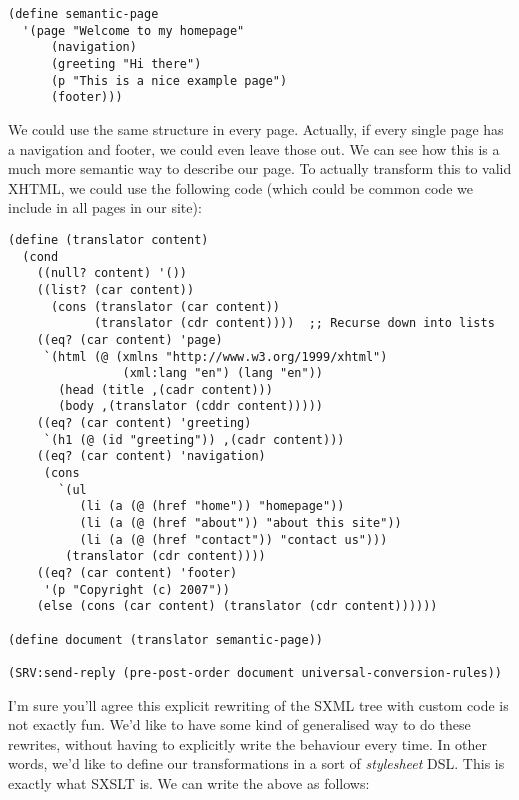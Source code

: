 \documentclass{article}
\begin{document}
\begin{verbatim}
(define semantic-page
  '(page "Welcome to my homepage"
      (navigation)
      (greeting "Hi there")
      (p "This is a nice example page")
      (footer)))
\end{verbatim}

We could use the same structure in every page.  Actually, if every
single page has a navigation and footer, we could even leave those
out.  We can see how this is a much more semantic way to describe our
page.  To actually transform this to valid XHTML, we could use the
following code (which could be common code we include in all pages in
our site):

\begin{verbatim}
(define (translator content)
  (cond
    ((null? content) '())
    ((list? (car content))
      (cons (translator (car content))
            (translator (cdr content))))  ;; Recurse down into lists
    ((eq? (car content) 'page)
     `(html (@ (xmlns "http://www.w3.org/1999/xhtml")
                (xml:lang "en") (lang "en"))
       (head (title ,(cadr content)))
       (body ,(translator (cddr content)))))
    ((eq? (car content) 'greeting)
     `(h1 (@ (id "greeting")) ,(cadr content)))
    ((eq? (car content) 'navigation)
     (cons
       `(ul
          (li (a (@ (href "home")) "homepage"))
          (li (a (@ (href "about")) "about this site"))
          (li (a (@ (href "contact")) "contact us")))
        (translator (cdr content))))
    ((eq? (car content) 'footer)
     '(p "Copyright (c) 2007"))
    (else (cons (car content) (translator (cdr content))))))

(define document (translator semantic-page))

(SRV:send-reply (pre-post-order document universal-conversion-rules))
\end{verbatim}

I'm sure you'll agree this explicit rewriting of the SXML tree with
custom code is not exactly fun.  We'd like to have some kind of
generalised way to do these rewrites, without having to explicitly
write the behaviour every time.  In other words, we'd like to define
our transformations in a sort of \emph{stylesheet} DSL.  This is
exactly what SXSLT is.  We can write the above as follows:
\end{document}
